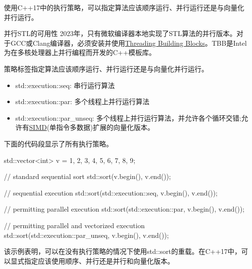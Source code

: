 使用C++17中的执行策略，可以指定算法应该顺序运行、并行运行还是与向量化并行运行。

\begin{myTip}{并行STL的可用性}
2023年，只有微软编译器本地实现了STL算法的并行版本。对于GCC或Clang编译器，必须安装并使用\href{https://en.wikipedia.org/wiki/Threading_Building_Blocks}{Threading Building Blocks}。TBB是Intel为在多核处理器上并行编程而开发的C++模板库。
\end{myTip}


策略标签指定算法应该顺序运行、并行运行还是与向量化并行运行。

\begin{itemize}
\item
std::execution::seq: 串行运行算法

\item
std::execution::par: 多个线程上并行运行算法

\item
std::execution::par\_unseq: 多个线程上并行运行算法，并允许各个循环交错;允许有\href{https://en.wikipedia.org/wiki/SIMD}{SIMD}(单指令多数据)扩展的向量化版本。
\end{itemize}

下面的代码段显示了所有执行策略。


\begin{cpp}
std::vector<int> v = {1, 2, 3, 4, 5, 6, 7, 8, 9};

// standard sequential sort
std::sort(v.begin(), v.end());

// sequential execution
std::sort(std::execution::seq, v.begin(), v.end());

// permitting parallel execution
std::sort(std::execution::par, v.begin(), v.end());

// permitting parallel and vectorized execution
std::sort(std::execution::par_unseq, v.begin(), v.end());
\end{cpp}

该示例表明，可以在没有执行策略的情况下使用std::sort的重载。在C++17中，可以显式指定应该使用顺序、并行还是并行和向量化版本。


